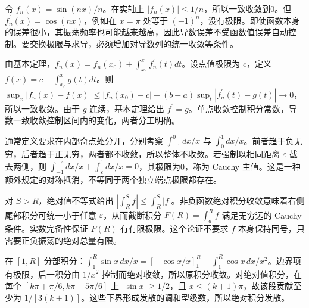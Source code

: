 \documentclass[UTF8,12pt,a4paper,fontset=fandol]{ctexart}
\begin{document}
\begin{solve}\label{ans:c30q12}
令 $f_n(x)=\sin(nx)/n$。在实轴上 $|f_n(x)|\le1/n$，所以一致收敛到0。但 $f_n^{\prime}(x)=\cos(nx)$，例如在 $x=\pi$ 处等于 $(-1)^n$，没有极限。即使函数本身的误差很小，其振荡频率也可能越来越高，因此导数误差不受函数值误差自动控制。要交换极限与求导，必须增加对导数列的统一收敛等条件。
\end{solve}

\begin{solve}\label{ans:c30q13}
由基本定理，$f_n(x)=f_n(x_0)+\int_{x_0}^xf_n^{\prime}(t)dt$。设点值极限为 $c$，定义 $f(x)=c+\int_{x_0}^xg(t)dt$。则 $\sup_x|f_n(x)-f(x)|\le|f_n(x_0)-c|+(b-a)\sup_t|f_n^{\prime}(t)-g(t)|\to0$，所以一致收敛。由于 $g$ 连续，基本定理给出 $f^{\prime}=g$。单点收敛控制积分常数，导数一致收敛控制区间内的变化，两者分工明确。
\end{solve}

\begin{solve}\label{ans:c30q14}
通常定义要求在内部奇点处分开，分别考察 $\int_{-1}^0dx/x$ 与 $\int_0^1dx/x$。前者趋于负无穷，后者趋于正无穷，两者都不收敛，所以整体不收敛。若强制以相同距离 $\varepsilon$ 截去两侧，则 $\int_{-1}^{-\varepsilon}dx/x+\int_\varepsilon^1dx/x=0$，其极限为0，称为 Cauchy 主值。这是一种额外规定的对称抵消，不等同于两个独立端点极限都存在。
\end{solve}

\begin{solve}\label{ans:c30q15}
对 $S>R$，绝对值不等式给出 $|\int_R^Sf|\le\int_R^S|f|$。非负函数绝对积分收敛意味着右侧尾部积分可统一小于任意 $\varepsilon$，从而截断积分 $F(R)=\int_a^Rf$ 满足无穷远的 Cauchy 条件。实数完备性保证 $F(R)$ 有有限极限。这个论证不要求 $f$ 本身保持同号，只需要正负振荡的绝对总量有限。
\end{solve}

\begin{solve}\label{ans:c30q16}
在 $[1,R]$ 分部积分：$\int_1^R\sin x\,dx/x=[-\cos x/x]_1^R-\int_1^R\cos x\,dx/x^2$。边界项有极限，后一积分由 $1/x^2$ 控制而绝对收敛，所以原积分收敛。对绝对值积分，在每个 $[k\pi+\pi/6,k\pi+5\pi/6]$ 上 $|\sin x|\ge1/2$，且 $x\le(k+1)\pi$，故该段贡献至少为 $1/[3(k+1)]$。这些下界形成发散的调和型级数，所以绝对积分发散。
\end{solve}
\end{document}

